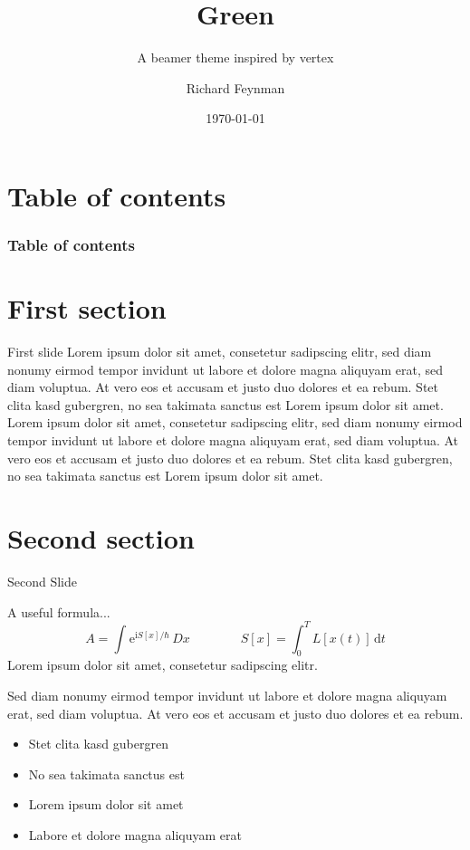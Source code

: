 \documentclass[compress,aspectratio=1610]{beamer}
\title{Green}
\subtitle{A beamer theme inspired by vertex}
\date{\today}
\author{Richard Feynman}
\begin{document}
\maketitle

\section*{Table of contents}
\begin{frame}
	\frametitle{Table of contents}
  \centering
	\tableofcontents[hideallsubsections]
\end{frame}

\section{First section}
\begin{frame}{First slide}
	Lorem ipsum dolor sit amet, consetetur sadipscing elitr, sed diam nonumy eirmod tempor invidunt ut labore et dolore magna aliquyam erat, sed diam voluptua. At vero eos et accusam et justo duo dolores et ea rebum. Stet clita kasd gubergren, no sea takimata sanctus est Lorem ipsum dolor sit amet. Lorem  ipsum dolor sit amet, consetetur sadipscing elitr, sed diam nonumy eirmod tempor invidunt ut labore et dolore magna aliquyam erat, sed diam voluptua. At vero eos et accusam et justo duo dolores et ea rebum. Stet clita kasd gubergren, no sea takimata sanctus est Lorem ipsum dolor sit amet.
\end{frame}

\section{Second section}
\begin{frame}{Second Slide}
  \begin{block}{A useful formula...}
    \begin{equation*}
      A = \int^{}\mathrm{e}^{\mathrm{i} S[x] / \hbar}\,Dx \hspace{4em} S[x] = \int^{T}_0 L[x(t)]\,\mathrm{d}t
    \end{equation*}
    \centering
Lorem ipsum dolor sit amet, consetetur sadipscing elitr.
  \end{block}
  \begin{multicols}{2}
Sed diam nonumy eirmod tempor invidunt ut labore et dolore magna aliquyam erat, sed diam voluptua. At vero eos et accusam et justo duo dolores et ea rebum.
  \columnbreak
  \begin{itemize}
    \item Stet clita kasd gubergren
    \item No sea takimata sanctus est
    \item Lorem ipsum dolor sit amet
    \item Labore et dolore magna aliquyam erat
  \end{itemize}
  \end{multicols}
\end{frame}
\end{document}
